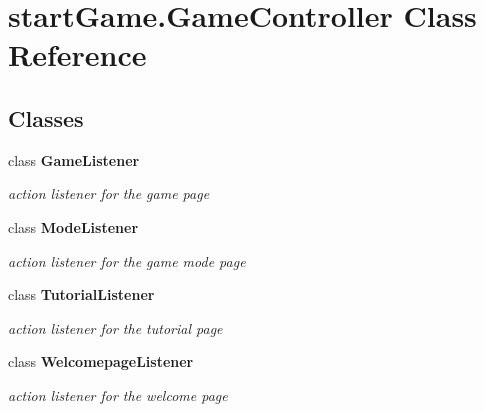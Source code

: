 \hypertarget{classstart_game_1_1_game_controller}{}\section{start\+Game.\+Game\+Controller Class Reference}
\label{classstart_game_1_1_game_controller}
\subsection*{Classes}
\begin{DoxyCompactItemize}
\item 
class {\bfseries Game\+Listener}
\begin{DoxyCompactList}\small\item\em action listener for the game page \end{DoxyCompactList}\item 
class {\bfseries Mode\+Listener}
\begin{DoxyCompactList}\small\item\em action listener for the game mode page \end{DoxyCompactList}\item 
class {\bfseries Tutorial\+Listener}
\begin{DoxyCompactList}\small\item\em action listener for the tutorial page \end{DoxyCompactList}\item 
class {\bfseries Welcomepage\+Listener}
\begin{DoxyCompactList}\small\item\em action listener for the welcome page \end{DoxyCompactList}\end{DoxyCompactItemize}

